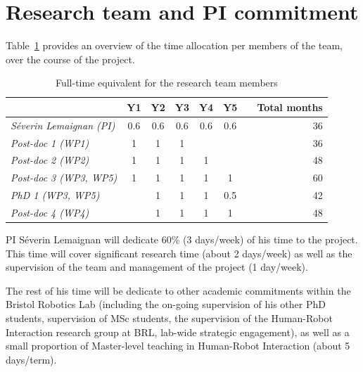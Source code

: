 \documentclass[11pt,a4paper]{report}
\begin{document}
\section{Research team and PI commitment}

Table~\ref{time-allocation-team} provides an overview of the time allocation per
members of the team, over the course of the project.

\begin{table}[h!]
    \centering
\begin{tabular}{@{}lccccccr@{}}
\toprule
\textit{\textbf{}}              & \textbf{Y1} & \textbf{Y2} & \textbf{Y3} & \textbf{Y4} & \textbf{Y5} &  & \textbf{Total months} \\ \midrule
\textit{Séverin Lemaignan (PI)} & 0.6         & 0.6         & 0.6         & 0.6    & 0.6         &  & 36                    \\ \midrule
\textit{Post-doc 1 (WP1)}       & 1           & 1           & 1           &             &             &  & 36                    \\
\textit{Post-doc 2 (WP2)}       & 1           & 1           & 1           & 1           &             &  & 48                    \\
\textit{Post-doc 3 (WP3, WP5)}  & 1           & 1           & 1           & 1           & 1           &  & 60                    \\
\textit{PhD 1 (WP3, WP5)}       &             & 1           & 1           & 1           & 0.5         &  & 42                    \\
\textit{Post-doc 4 (WP4)}       &             & 1           & 1           & 1           & 1           &  & 48                    \\ \bottomrule
\end{tabular}
    \caption{Full-time equivalent for the research team members}
    \label{time-allocation-team}
\end{table}

PI Séverin Lemaignan will dedicate 60\% (3 days/week) of his time to the
project. This time will cover significant research time (about 2 days/week) as
well as the supervision of the team and management of the project (1 day/week).

The rest of his time will be dedicate to other academic commitments within the
Bristol Robotics Lab (including the on-going supervision of his other PhD
students, supervision of MSc students, the supervision of the Human-Robot
Interaction research group at BRL, lab-wide strategic engagement), as well as a
small proportion of Master-level teaching in Human-Robot Interaction (about 5
days/term).
\end{document}
